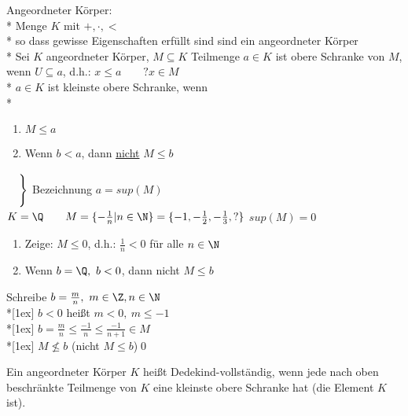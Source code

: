 \wdh
Angeordneter Körper:\\*
Menge $K$ mit $+, ·, <$\\*
so dass gewisse Eigenschaften erfüllt sind
\bsp
\Q{} sind ein angeordneter Körper\\*
Sei $K$ angeordneter Körper, $M\subseteq K$ Teilmenge $a\in K$ ist obere Schranke von $M$, wenn $U\subseteq a$, d.h.: $x\leq a\qquad ?x\in M$\\*
$a\in K$ ist kleinste obere Schranke, wenn\\*
\begin{enumerate}
\item{$M\leq a$}
\item{Wenn $b < a$, dann \ul{nicht} $M\leq b$}
\end{enumerate}
\vspace*{-9.5ex}\hspace*{15.5em}
$\left.
\begin{array}{l}
{}\vspace*{2ex}\\*{}
\end{array}
\right\}$
\vspace*{-5ex}Bezeichnung $a=sup(M)$
\vspace*{5ex}
%
\bsp
$K=\Q\qquad M=\{-\frac{1}{n}|n\in\N\}=\{-1,-\frac{1}{2},-\frac{1}{3},?\}$
$sup(M)=0$
\bew
\begin{enumerate}
\item {Zeige: $M \leq 0$, d.h.: $\frac{1}{n}<0$ für alle $n\in\N$\ok}
\item {Wenn $b=\Q,\ b<0$, dann nicht $M\leq b$}
\end{enumerate}
Schreibe $b=\frac{m}{n},\ m\in\Z, n\in\N$\\*[1ex]
$b<0$ heißt $m<0,\ m\leq -1$\\*[1ex]
$b=\frac{m}{n} \leq \frac{-1}{n} \leq \frac{-1}{n+1}\in M$\\*[1ex]
\Rarr{} $M\not\leq b$ (nicht $M\leq b$)\qed

Ein angeordneter Körper $K$ heißt Dedekind-vollständig, wenn jede nach oben beschränkte Teilmenge von $K$ eine kleinste obere Schranke hat (die Element $K$ ist).

